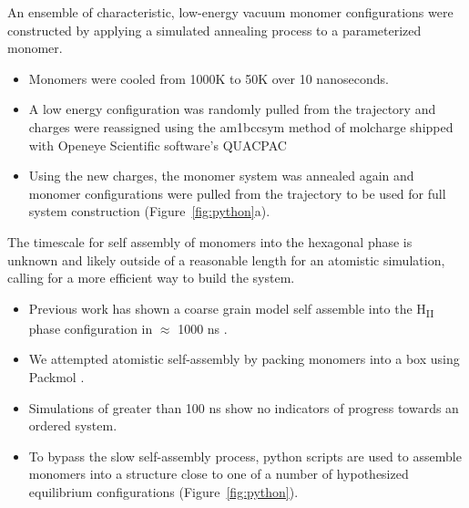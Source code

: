 \documentclass{article}
\begin{document}
  An ensemble of characteristic, low-energy vacuum monomer configurations
  were constructed by applying a simulated annealing process to a
  parameterized monomer.
  \begin{itemize}
    \item Monomers were cooled from 1000K to 50K over 10 nanoseconds.
    \item A low energy configuration was randomly pulled from the trajectory
    and charges were reassigned using the am1bccsym method of molcharge
    shipped with Openeye Scientific software's QUACPAC %
    \item Using the new charges, the monomer system was annealed again and monomer
    configurations were pulled from the trajectory to be used for full
    system construction (Figure~\ref{fig:python}a).
  \end{itemize}
  
  The timescale for self assembly of monomers into the hexagonal phase is
  unknown and likely outside of a reasonable length for an atomistic
  simulation, calling for a more efficient way to build the system. 
  \begin{itemize}
    \item Previous work has shown a coarse grain model self assemble into
    the H\textsubscript{II} phase configuration in $\approx$ 1000 ns \cite{mondal_self-assembly_2013}.
    \item We attempted atomistic self-assembly by packing monomers into a box 
    using Packmol \cite{martinez_packmol:_2009}.
    \item Simulations of greater than 100 ns show no indicators of progress 
    towards an ordered system.
    \item To bypass the slow self-assembly process, python scripts are used
    to assemble monomers into a structure close to one of a number of 
    hypothesized equilibrium configurations (Figure~\ref{fig:python}).
   \end{itemize}
\end{document}
